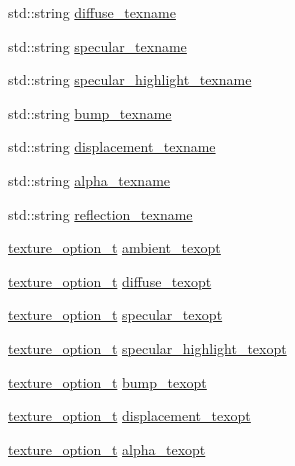\begin{DoxyCompactItemize}
std\+::string \hyperlink{structtinyobj_1_1material__t_ad7f71a301a261fca07d2e50edccc792d}{diffuse\+\_\+texname}
\item 
std\+::string \hyperlink{structtinyobj_1_1material__t_aed8c38d64472ba0db5186dba800b1b34}{specular\+\_\+texname}
\item 
std\+::string \hyperlink{structtinyobj_1_1material__t_a5c0e981297646f1fc1aeba616692c41b}{specular\+\_\+highlight\+\_\+texname}
\item 
std\+::string \hyperlink{structtinyobj_1_1material__t_aceb73086232f1cdd82f956fe8c6efcfb}{bump\+\_\+texname}
\item 
std\+::string \hyperlink{structtinyobj_1_1material__t_ab69842db3e67cc7d4dcd8bfe02590f92}{displacement\+\_\+texname}
\item 
std\+::string \hyperlink{structtinyobj_1_1material__t_a1b0225fd76de506f089fdedbf2c66dec}{alpha\+\_\+texname}
\item 
std\+::string \hyperlink{structtinyobj_1_1material__t_a111faaae52874d8715c7719acf60d726}{reflection\+\_\+texname}
\item 
\hyperlink{structtinyobj_1_1texture__option__t}{texture\+\_\+option\+\_\+t} \hyperlink{structtinyobj_1_1material__t_ad168f86b0f3f67666b102f9a26a2170b}{ambient\+\_\+texopt}
\item 
\hyperlink{structtinyobj_1_1texture__option__t}{texture\+\_\+option\+\_\+t} \hyperlink{structtinyobj_1_1material__t_a170412a1e339856e55d5cec406ecc196}{diffuse\+\_\+texopt}
\item 
\hyperlink{structtinyobj_1_1texture__option__t}{texture\+\_\+option\+\_\+t} \hyperlink{structtinyobj_1_1material__t_aec86b92157df1e714aeb1f28ebabae24}{specular\+\_\+texopt}
\item 
\hyperlink{structtinyobj_1_1texture__option__t}{texture\+\_\+option\+\_\+t} \hyperlink{structtinyobj_1_1material__t_a9bfc943306506fa35abbb4377b8c071e}{specular\+\_\+highlight\+\_\+texopt}
\item 
\hyperlink{structtinyobj_1_1texture__option__t}{texture\+\_\+option\+\_\+t} \hyperlink{structtinyobj_1_1material__t_a77cb124464a606ad2b649196e72c39a0}{bump\+\_\+texopt}
\item 
\hyperlink{structtinyobj_1_1texture__option__t}{texture\+\_\+option\+\_\+t} \hyperlink{structtinyobj_1_1material__t_a6f28d7a04ebb6435c62adb502847f4c3}{displacement\+\_\+texopt}
\item 
\hyperlink{structtinyobj_1_1texture__option__t}{texture\+\_\+option\+\_\+t} \hyperlink{structtinyobj_1_1material__t_adb6fdf38b462c4bd91fc2927282a3fc1}{alpha\+\_\+texopt}

\end{DoxyCompactItemize}
